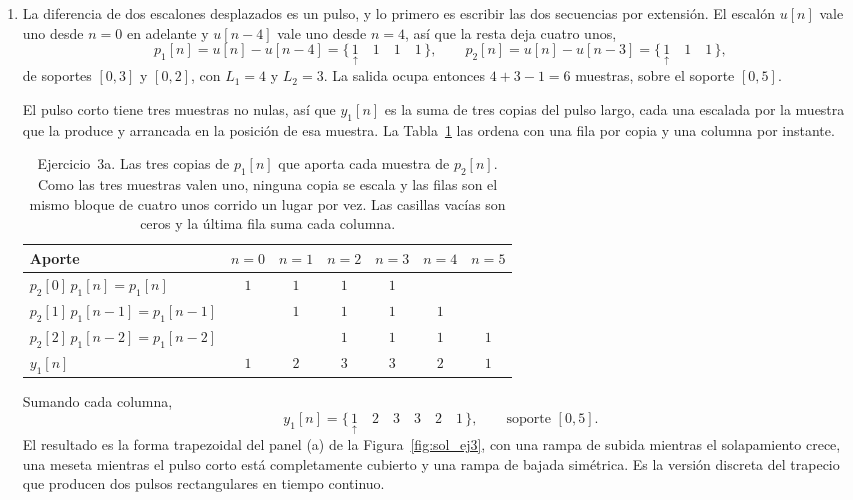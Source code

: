 \documentclass[10pt,a4paper]{article}
\begin{document}
	\begin{enumerate}
		\item La diferencia de dos escalones desplazados
		es un pulso, y lo primero es escribir las dos secuencias por extensión. El escalón
		$u[n]$ vale uno desde $n=0$ en adelante y $u[n-4]$ vale uno desde $n=4$, así que la
		resta deja cuatro unos,
		\[
			p_1[n] = u[n]-u[n-4] = \{\, \underset{\uparrow}{1} \quad 1 \quad 1 \quad 1 \,\},
			\qquad
			p_2[n] = u[n]-u[n-3] = \{\, \underset{\uparrow}{1} \quad 1 \quad 1 \,\},
		\]
		de soportes $[0,3]$ y $[0,2]$, con $L_1=4$ y $L_2=3$. La salida ocupa entonces
		$4+3-1=6$ muestras, sobre el soporte $[0,5]$.

		El pulso corto tiene tres muestras no nulas, así que $y_1[n]$ es la suma de tres
		copias del pulso largo, cada una escalada por la muestra que la produce y arrancada
		en la posición de esa muestra. La Tabla~\ref{tab:sol_ej3} las ordena con una fila por
		copia y una columna por instante.

		\begin{table}[H]
			\centering
			\caption{Ejercicio~3a. Las tres copias de $p_1[n]$ que aporta cada muestra de
			$p_2[n]$. Como las tres muestras valen uno, ninguna copia se escala y las filas
			son el mismo bloque de cuatro unos corrido un lugar por vez. Las casillas vacías
			son ceros y la última fila suma cada columna.}
			\label{tab:sol_ej3}
			\renewcommand{\arraystretch}{1.3}
			\begin{tabular}{lcccccc}
				\toprule
				Aporte & $n=0$ & $n=1$ & $n=2$ & $n=3$ & $n=4$ & $n=5$ \\
				\midrule
				$p_2[0]\,p_1[n]   = p_1[n]$   & $1$ & $1$ & $1$ & $1$ &     &     \\
				$p_2[1]\,p_1[n-1] = p_1[n-1]$ &     & $1$ & $1$ & $1$ & $1$ &     \\
				$p_2[2]\,p_1[n-2] = p_1[n-2]$ &     &     & $1$ & $1$ & $1$ & $1$ \\
				\midrule
				$y_1[n]$ & $1$ & $2$ & $3$ & $3$ & $2$ & $1$ \\
				\bottomrule
			\end{tabular}
		\end{table}

		Sumando cada columna,
		\[
			\boxed{\;y_1[n] = \{\, \underset{\uparrow}{1} \quad 2 \quad 3 \quad 3 \quad 2 \quad 1 \,\},
			\qquad \text{soporte } [0,5].\;}
		\]
		El resultado es la forma trapezoidal del panel (a) de la
		Figura~\ref{fig:sol_ej3}, con una rampa de subida mientras el solapamiento crece, una
		meseta mientras el pulso corto está completamente cubierto y una rampa de bajada
		simétrica. Es la versión discreta del trapecio que producen dos pulsos rectangulares
		en tiempo continuo.


\end{enumerate}
\end{document}
